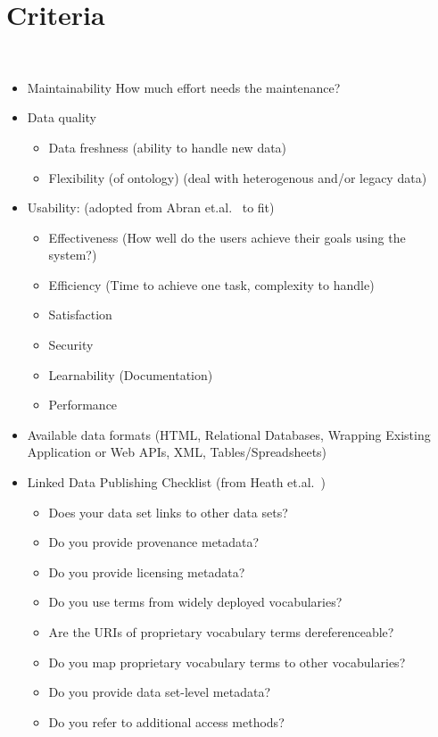 \chapter{Criteria}

~\cite{baronyai_publishing_2016}

\begin{itemize}
\item Maintainability
How much effort needs the maintenance? 

\item Data quality 
\begin{itemize}
\item Data freshness (ability to handle new data)
\item Flexibility (of ontology) (deal with heterogenous and/or legacy data)
\end{itemize}

\item Usability: (adopted from Abran et.al.~\cite{abran2003usability} to fit)
\begin{itemize}
\item Effectiveness (How well do the users achieve their goals using the system?)
\item Efficiency (Time to achieve one task, complexity to handle)
\item Satisfaction
\item Security
\item Learnability (Documentation)
\item Performance
\end{itemize}

\item Available data formats (HTML, Relational Databases, Wrapping Existing Application or Web APIs, XML, Tables/Spreadsheets)

\item Linked Data Publishing Checklist (from Heath et.al.~\cite{heath2011linked})
\begin{itemize}
\item Does your data set links to other data sets?
\item Do you provide provenance metadata?
\item Do you provide licensing metadata?
\item Do you use terms from widely deployed vocabularies?
\item Are the URIs of proprietary vocabulary terms dereferenceable?
\item Do you map proprietary vocabulary terms to other vocabularies?
\item Do you provide data set-level metadata?
\item Do you refer to additional access methods?
\end{itemize}
\end{itemize}

